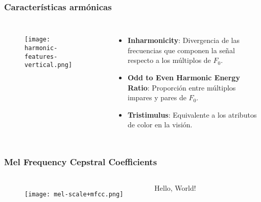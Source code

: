 \begin{frame}
    \frametitle{Características armónicas}

    \begin{columns}

        \begin{figure}[!h]
            \centering
            \texttt{[image: harmonic-features-vertical.png]}
        \end{figure}


        \begin{itemize}
            \item<1-> \textbf{Inharmonicity}: Divergencia de las frecuencias que componen la señal respecto a los múltiplos de $F_0$.
            \item<2-> \textbf{Odd to Even Harmonic Energy Ratio}: Proporción entre múltiplos impares y pares de $F_0$.
            \item<3-> \textbf{Tristimulus}: Equivalente a los atributos de color en la visión.
        \end{itemize}

    \end{columns}
\end{frame}

\begin{frame}
    \frametitle{Mel Frequency Cepstral Coefficients}

    \begin{columns}

        \begin{figure}[!h]
            \centering
            \texttt{[image: mel-scale+mfcc.png]}
        \end{figure}


        Hello, World!

    \end{columns}
\end{frame}
